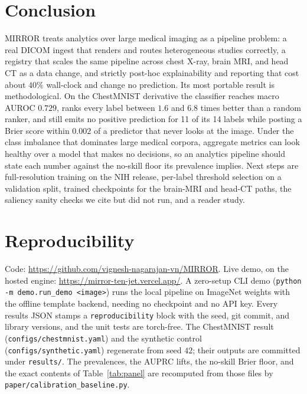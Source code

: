 \documentclass[conference]{IEEEtran}
\newcommand{\code}[1]{\texttt{\small #1}}
\begin{document}
\section{Conclusion}

MIRROR treats analytics over large medical imaging as a pipeline problem: a real
DICOM ingest that renders and routes heterogeneous studies correctly, a registry
that scales the same pipeline across chest X-ray, brain MRI, and head CT as a data
change, and strictly post-hoc explainability and reporting that cost about $40\%$
wall-clock and change no prediction. Its most portable result is methodological. On
the ChestMNIST derivative the classifier reaches macro AUROC $0.729$, ranks every
label between $1.6$ and $6.8$ times better than a random ranker, and still emits no
positive prediction for 11 of its 14 labels while posting a Brier score within
$0.002$ of a predictor that never looks at the image. Under the class imbalance that
dominates large medical corpora, aggregate metrics can look healthy over a model
that makes no decisions, so an analytics pipeline should state each number against
the no-skill floor its prevalence implies. Next steps are full-resolution training
on the NIH release, per-label threshold selection on a validation split, trained
checkpoints for the brain-MRI and head-CT paths, the saliency sanity checks we cite
but did not run, and a reader study.

\section*{Reproducibility}
\footnotesize
Code: \url{https://github.com/vignesh-nagarajan-vn/MIRROR}. Live demo, on the hosted
engine: \url{https://mirror-ten-jet.vercel.app/}. A zero-setup CLI demo
(\code{python -m demo.run\_demo <image>}) runs the local pipeline on ImageNet weights
with the offline template backend, needing no checkpoint and no API key. Every
results JSON stamps a \code{reproducibility} block with the seed, git commit, and
library versions, and the unit tests are torch-free. The ChestMNIST result
(\code{configs/chestmnist.yaml}) and the synthetic control
(\code{configs/synthetic.yaml}) regenerate from seed $42$; their outputs are
committed under \code{results/}. The prevalences, the AUPRC lifts, the no-skill Brier
floor, and the exact contents of Table~\ref{tab:panel} are recomputed from those
files by \code{paper/calibration\_baseline.py}.
\end{document}
